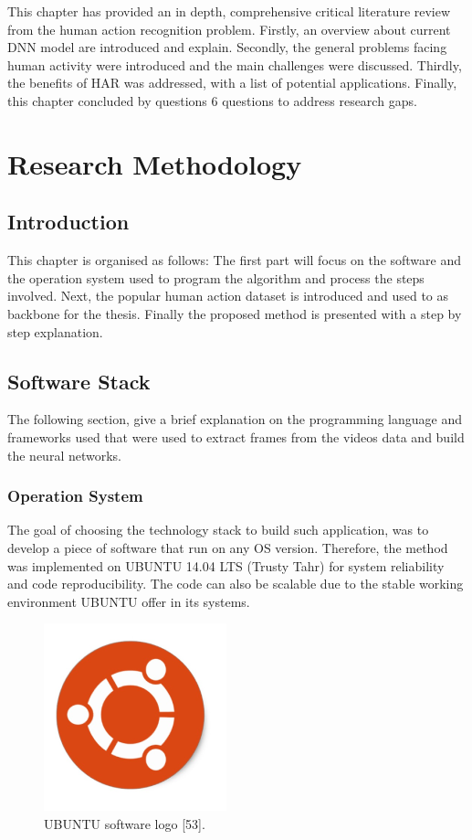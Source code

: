 This chapter has provided an in depth, comprehensive critical literature review from the human action recognition problem. Firstly, an overview about current DNN model are introduced and explain. Secondly, the general problems facing human activity were introduced and the main challenges were discussed. Thirdly, the benefits of HAR was addressed, with a list of potential applications. Finally, this chapter concluded by questions 6 questions to address research gaps.


\chapter{Research Methodology}
\section{Introduction}
\hspace{5mm} This chapter is organised as follows: The first part will focus on the software and the operation system used to program the algorithm and process the steps involved. Next, the popular human action dataset is introduced and used to as backbone for the thesis. Finally the proposed method is presented with a step by step explanation.
\section{Software Stack}
\hspace{5mm} The following section, give a brief explanation on the programming language and frameworks used that were used to extract frames from the videos data and build the neural networks.
\subsection{Operation System}
\hspace{5mm} The goal of choosing the technology stack to build such application, was to develop a piece of software that run on any OS version. Therefore, the method was implemented on UBUNTU 14.04 LTS (Trusty Tahr) for system reliability and code reproducibility. The code can also be scalable due to the stable working environment UBUNTU offer in its systems.
\begin{figure}[ht]
\centering
\includegraphics{Figures/u}
\decoRule
\caption[UBUNTU software logo "53".]{UBUNTU software logo [53].}
\label{fig:la}
\end{figure}

